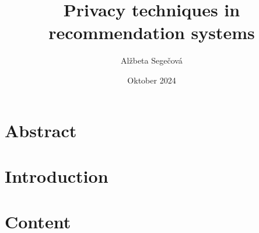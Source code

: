 \documentclass[10pt,letterpaper]{article}
\title{Privacy techniques in recommendation systems}
\author{Alžbeta Segečová}
\date{Oktober 2024}
\begin{document}
\maketitle

\section{Abstract}


\section{Introduction}


\section{Content}


\section{}
\end{document}
